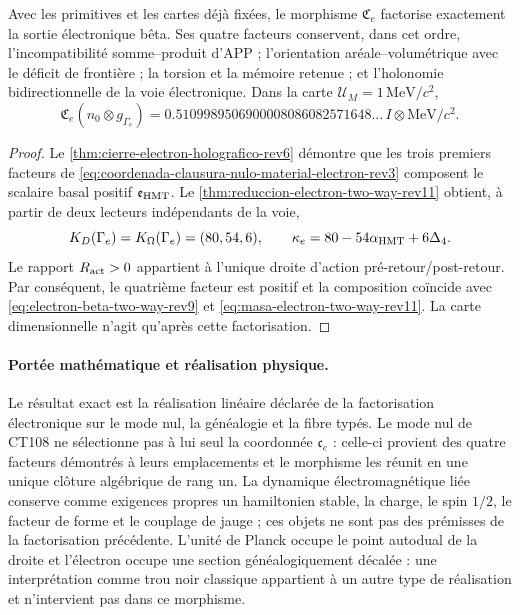 \begin{theorem}
\label{thm:clausura-nulo-material-electron-rev3}
Avec les primitives et les cartes déjà fixées, le morphisme
\(\mathfrak C_e\) factorise exactement la sortie électronique bêta. Ses
quatre facteurs conservent, dans cet ordre, l'incompatibilité somme--produit
d'APP ; l'orientation aréale--volumétrique avec le déficit de frontière ;
la torsion et la mémoire retenue ; et l'holonomie bidirectionnelle de la voie
électronique. Dans la carte \(\mathcal U_M=1\,\mathrm{MeV}/c^2\),
\begin{equation}
 \mathfrak C_e(n_0\otimes g_{\Gamma_e})
 =0.5109989506900008086082571648\ldots\,
  I\otimes\mathrm{MeV}/c^2.
 \label{eq:masa-clausura-nulo-material-electron-rev3}
\end{equation}
\end{theorem}

\begin{proof}
Le \cref{thm:cierre-electron-holografico-rev6} démontre que les trois
premiers facteurs de
\eqref{eq:coordenada-clausura-nulo-material-electron-rev3} composent le
scalaire basal positif \(\mathfrak e_{\rm HMT}\). Le
\cref{thm:reduccion-electron-two-way-rev11} obtient, à partir de deux lecteurs
indépendants de la voie,
\[
 K_D(\Gamma_e)=K_\Omega(\Gamma_e)=(80,54,6),
 \qquad
 \kappa_e=80-54\alpha_{\rm HMT}+6\Delta_4.
\]
Le rapport \(R_{\rm act}>0\) appartient à l'unique droite d'action
pré-retour/post-retour. Par conséquent, le quatrième facteur est positif et
la composition coïncide avec
\eqref{eq:electron-beta-two-way-rev9} et
\eqref{eq:masa-electron-two-way-rev11}. La carte dimensionnelle n'agit
qu'après cette factorisation.
\end{proof}

\paragraph{Portée mathématique et réalisation physique.}
Le résultat exact est la réalisation linéaire déclarée de la factorisation
électronique sur le mode nul, la généalogie et la fibre typés. Le mode
nul de CT108 ne sélectionne pas à lui seul la coordonnée \(\mathfrak c_e\) :
celle-ci provient des quatre facteurs démontrés à leurs emplacements et le
morphisme les réunit en une unique clôture algébrique de rang un. La dynamique électromagnétique
liée conserve comme exigences propres un hamiltonien stable, la charge,
le spin \(1/2\), le facteur de forme et le couplage de jauge ; ces objets ne
sont pas des prémisses de la factorisation précédente. L'unité de Planck occupe le
point autodual de la droite et l'électron occupe une section généalogiquement
décalée : une interprétation comme trou noir classique appartient à un autre
type de réalisation et n'intervient pas dans ce morphisme.
